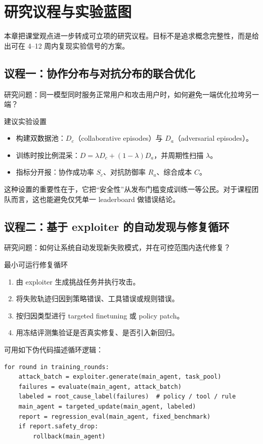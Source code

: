 \section{研究议程与实验蓝图}

本章把课堂观点进一步转成可立项的研究议程。目标不是追求概念完整性，而是给出可在 4--12 周内复现实验信号的方案。

\subsection{议程一：协作分布与对抗分布的联合优化}
研究问题：同一模型同时服务正常用户和攻击用户时，如何避免一端优化拉垮另一端？

\begin{knowledgebox}{建议实验设置}
\begin{itemize}
    \item 构建双数据池：$D_c$（collaborative episodes）与 $D_a$（adversarial episodes）。
    \item 训练时按比例混采：$D = \lambda D_c + (1-\lambda)D_a$，并周期性扫描 $\lambda$。
    \item 指标分开报：协作成功率 $S_c$、对抗防御率 $R_a$、综合成本 $C$。
\end{itemize}
\end{knowledgebox}

这种设置的重要性在于，它把``安全性''从发布门槛变成训练一等公民。对于课程团队而言，这也能避免仅凭单一 leaderboard 做错误结论。

\subsection{议程二：基于 exploiter 的自动发现与修复循环}
研究问题：如何让系统自动发现新失败模式，并在可控范围内迭代修复？

\begin{importantbox}{最小可运行修复循环}
\begin{enumerate}
    \item 由 exploiter 生成挑战任务并执行攻击。
    \item 将失败轨迹归因到策略错误、工具错误或规则错误。
    \item 按归因类型进行 targeted finetuning 或 policy patch。
    \item 用冻结评测集验证是否真实修复、是否引入新回归。
\end{enumerate}
\end{importantbox}

可用如下伪代码描述循环逻辑：
\begin{lstlisting}[caption={Auto-Exploit to Auto-Repair 循环（示意）}]
for round in training_rounds:
    attack_batch = exploiter.generate(main_agent, task_pool)
    failures = evaluate(main_agent, attack_batch)
    labeled = root_cause_label(failures)  # policy / tool / rule
    main_agent = targeted_update(main_agent, labeled)
    report = regression_eval(main_agent, fixed_benchmark)
    if report.safety_drop:
        rollback(main_agent)
\end{lstlisting}

